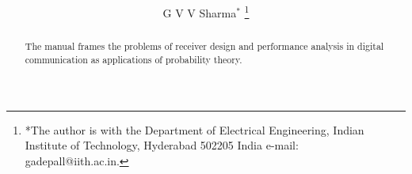 \documentclass[journal,12pt,twocolumn]{IEEEtran}
\begin{document}
\title{
}
%
%
%

\author{G V V Sharma$^{*}$%
\thanks{*The author is with the Department
of Electrical Engineering, Indian Institute of Technology, Hyderabad
502205 India e-mail:  gadepall@iith.ac.in.}%
}



\maketitle

\tableofcontents

\bigskip

\renewcommand{\thefigure}{\theenumi}
\renewcommand{\thetable}{\theenumi}

\begin{abstract}
The manual frames the problems of receiver design and performance analysis in digital communication as applications of probability theory.

\end{abstract}

\end{document}
